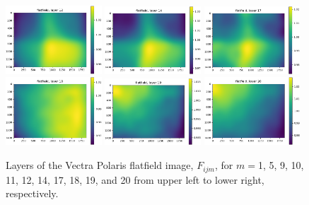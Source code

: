 \documentclass[letterpaper,11pt]{article}
\begin{document}
\begin{figure}[!ht]
\includegraphics[width=0.32\textwidth]{images/results/flatfield_layers_polaris/flatfield_layer_12}
\includegraphics[width=0.32\textwidth]{images/results/flatfield_layers_polaris/flatfield_layer_14}
\includegraphics[width=0.32\textwidth]{images/results/flatfield_layers_polaris/flatfield_layer_17}
\includegraphics[width=0.32\textwidth]{images/results/flatfield_layers_polaris/flatfield_layer_18}
\includegraphics[width=0.32\textwidth]{images/results/flatfield_layers_polaris/flatfield_layer_19}
\includegraphics[width=0.32\textwidth]{images/results/flatfield_layers_polaris/flatfield_layer_20}
\caption{\footnotesize Layers of the Vectra Polaris flatfield image, $F_{ijm}$, for $m=$1, 5, 9, 10, 11, 12, 14, 17, 18, 19, and 20 from upper left to lower right, respectively.}
\label{fig:flatfield_image_layers_polaris_1}
\end{figure}
\end{document}
